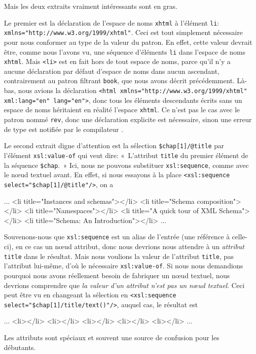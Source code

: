 Mais les deux extraits vraiment intéressants sont en gras.

Le premier est la déclaration de l'espace de noms \texttt{xhtml} à
l'élément \texttt{li}:
\texttt{xmlns="http://www.w3.org/1999/xhtml"}. Ceci est tout
simplement nécessaire pour nous conformer au type de la valeur du
patron. En effet, cette valeur devrait être, comme nous l'avons vu,
une séquence d'éléments \texttt{li} dans l'espace de noms
\texttt{xhtml}. Mais \texttt{<li>} est en fait hors de tout espace de
noms, parce qu'il n'y a aucune déclaration par défaut d'espace de noms
dans aucun ascendant, contrairement au patron filtrant \texttt{book},
que nous avons décrit précédemment. Là-bas, nous avions la déclaration
\texttt{<html xmlns="http://www.w3.org/1999/xhtml" xml:lang="en"
  lang="en">}, donc tous les éléments descendants écrits sans un
espace de noms héritaient en réalité l'espace \texttt{xhtml}. Ce n'est
pas le cas avec le patron nommé \texttt{rev}, donc une déclaration
explicite est nécessaire, sinon une erreur de type est notifiée par le
compilateur \XSLT.

Le second extrait digne d'attention est la sélection
\texttt{\$chap[1]/@title} par l'élément \texttt{xsl:value-of} qui veut
dire: «~L'attribut \texttt{title} du premier élément de la séquence
\texttt{\$chap}.~» Ici, nous ne pouvons substituer
\texttt{xsl:sequence}, comme avec le nœud textuel avant. En effet,
si nous essayons à la place \texttt{<xsl:sequence
  select="\$chap[1]/@title"/>}, on a
\begin{sverb}
       ...
         <li title="Instances and schemas"></li>
         <li title="Schema composition"></li>
         <li title="Namespaces"></li>
         <li title="A quick tour of XML Schema"></li>
         <li title="Schema: An Introduction"></li>
       ...
\end{sverb}
Souvenons-nous que \texttt{xsl:sequence} est un alias de l'entrée (une
référence à celle-ci), en ce cas un nœud attribut, donc nous
devrions nous attendre à un \emph{attribut} \texttt{title} dans le
résultat. Mais nous voulions la valeur de l'attribut \texttt{title},
pas l'attribut lui-même, d'où le nécessaire \texttt{xsl:value-of}. Si
nous nous demandions pourquoi nous avons réellement besoin de
fabriquer un nœud textuel, nous devrions comprendre que \emph{la
  valeur d'un attribut n'est pas un nœud textuel}. Ceci peut être
vu en changeant la sélection en \texttt{<xsl:sequence
  select="\$chap[1]/title/text()"/>}, auquel cas, le résultat est
\begin{sverb}
       ...
         <li></li>
         <li></li>
         <li></li>
         <li></li>
         <li></li>
       ...
\end{sverb}
Les attributs sont spéciaux et souvent une source de confusion pour
les débutants.


